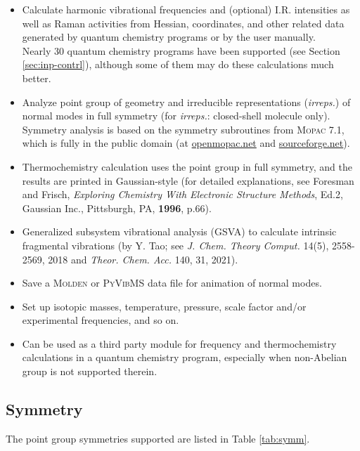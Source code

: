 \documentclass[12pt,english]{extarticle}
\begin{document}
\begin{itemize}
\item Calculate harmonic vibrational frequencies and (optional) I.R. intensities as well as Raman activities from Hessian, coordinates, and other related data generated by quantum chemistry programs or by the user manually. \\
    Nearly 30 quantum chemistry programs have been supported (see Section \ref{sec:inp-contrl}), although some of them may do these calculations much better.
\item Analyze point group of geometry and irreducible representations (\emph{irreps.}) of normal modes in full symmetry (for \emph{irreps.}: closed-shell molecule only). \\
    Symmetry analysis is based on the symmetry subroutines from \textsc{Mopac} 7.1, which is fully in the public domain (at \href{http://openmopac.net/Downloads/Downloads.html}{openmopac.net} and \href{https://sourceforge.net/projects/mopac7/}{sourceforge.net}).
\item Thermochemistry calculation uses the point group in full symmetry, and the results are printed in Gaussian-style (for detailed explanations, see Foresman and Frisch, \emph{Exploring Chemistry With Electronic Structure Methods}, Ed.2, Gaussian Inc., Pittsburgh, PA, \textbf{1996}, p.66).
\item Generalized subsystem vibrational analysis (GSVA) to calculate intrinsic fragmental vibrations (by Y. Tao; see \textit{J. Chem. Theory Comput.} 14(5), 2558-2569, 2018 and \textit{Theor. Chem. Acc.} 140, 31, 2021).
\item Save a \textsc{Molden} or \textsc{PyVibMS} data file for animation of normal modes.
\item Set up isotopic masses, temperature, pressure, scale factor and/or experimental frequencies, and so on.
\item Can be used as a third party module for frequency and thermochemistry calculations in a quantum chemistry program, especially when non-Abelian group is not supported therein.
\end{itemize}

\subsection{Symmetry} \label{sec:symm}

The point group symmetries supported are listed in Table \ref{tab:symm}.
\end{document}
